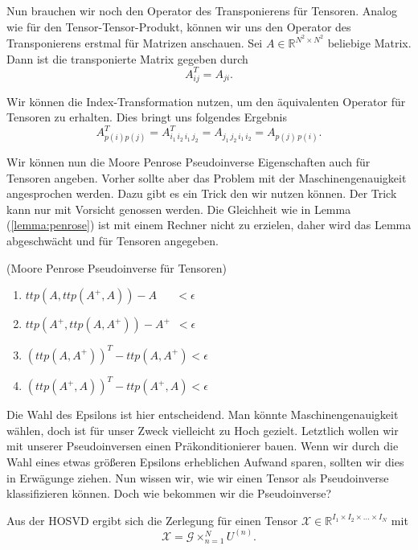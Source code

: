Nun brauchen wir noch den Operator des Transponierens für Tensoren. Analog wie für den Tensor-Tensor-Produkt, können wir uns den Operator des Transponierens erstmal für Matrizen anschauen.
Sei $A \in \mathbb{R}^{N^2 \times N^2}$ beliebige Matrix.  Dann ist die transponierte Matrix gegeben durch
\begin{equation}
A_{ij}^T = A_{ji}.
\end{equation}

Wir können die Index-Transformation nutzen, um den äquivalenten Operator für Tensoren zu erhalten. Dies bringt uns folgendes Ergebnis
\begin{equation}
A_{p(i)p(j)}^T=A_{i_1 \, i_2 \, i_1 \, j_2}^T=A_{ j_1 \, j_2 \, i_1 \, i_2}=A_{p(j) \,p(i)}.
\end{equation}

Wir können nun die Moore Penrose Pseudoinverse Eigenschaften auch für Tensoren angeben. Vorher sollte aber das Problem mit der Maschinengenauigkeit angesprochen werden. 
Dazu gibt es ein Trick den wir nutzen können. Der Trick kann nur mit Vorsicht genossen werden. Die Gleichheit wie in Lemma (\ref{lemma:penrose}) ist mit einem Rechner nicht zu erzielen, daher wird das Lemma abgeschwächt und für Tensoren angegeben. 
\begin{Lemma} (Moore Penrose Pseudoinverse für Tensoren)
\begin{enumerate}
\item $ttp(A,ttp(A^{+},A))-A \, \, \, \, \, \, \, \, \, \, < \epsilon$
\item $ttp(A^{+},ttp(A,A^{+}))-A^{+} \, \,  \, < \epsilon $ 
\item $(ttp(A,A^{+}))^{T}-ttp(A,A^{+}) < \epsilon $ 
\item $(ttp(A^{+},A))^{T}-ttp(A^{+},A) < \epsilon $ 
\end{enumerate}
\end{Lemma}

Die Wahl des Epsilons ist hier entscheidend. Man könnte Maschinengenauigkeit wählen, doch ist für unser Zweck vielleicht zu Hoch gezielt. Letztlich wollen wir mit unserer Pseudoinversen einen Präkonditionierer bauen. Wenn wir durch die Wahl eines etwas größeren Epsilons erheblichen Aufwand sparen, sollten wir dies in Erwägunge ziehen.
Nun wissen wir, wie wir einen Tensor als Pseudoinverse klassifizieren können. Doch wie bekommen wir die Pseudoinverse?

Aus der HOSVD ergibt sich die Zerlegung für einen Tensor $\pmb{\mathscr{X}}  \in \mathbb{R}^{I_1 \times I_2 \times \dots \times I_N}$  mit
\begin{equation}
\pmb{\mathscr{X}} = \pmb{\mathscr{G}} \times_{n=1}^{N} U^{ (n) }.
\end{equation}

